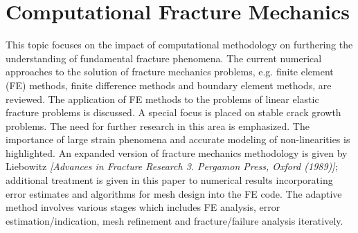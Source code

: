 \documentclass[11pt]{article}
\begin{document}
\section{Computational Fracture Mechanics}
This topic focuses on the impact of computational methodology on furthering the understanding of fundamental fracture phenomena. The current numerical approaches to the solution of fracture
mechanics problems, e.g. finite element (FE) methods, finite difference methods and boundary element
methods, are reviewed. The application of FE methods to the problems of linear elastic fracture problems
is discussed. A special focus is placed on stable crack growth problems. The need for further research in this
area is emphasized. The importance of large strain phenomena and accurate modeling of non-linearities
is highlighted. An expanded version of fracture mechanics methodology is given by Liebowitz \textit{[Advances  in Fracture Research 3. Pergamon Press, Oxford (1989)]}; additional treatment is given in this paper to
numerical results incorporating error estimates and algorithms for mesh design into the FE code. The
adaptive method involves various stages which includes FE analysis, error estimation/indication, mesh
refinement and fracture/failure analysis iteratively.

\end{document}
